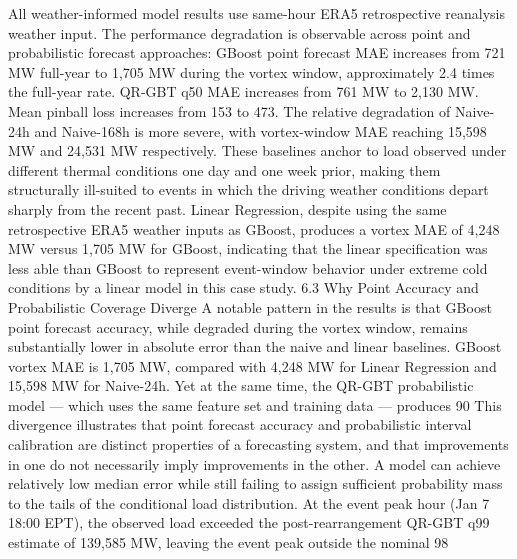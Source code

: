 All weather-informed model results use same-hour ERA5 retrospective reanalysis weather input. The performance degradation is observable across point and probabilistic forecast approaches: GBoost point forecast MAE increases from 721 MW full-year to 1,705 MW during the vortex window, approximately 2.4 times the full-year rate. QR-GBT q50 MAE increases from 761 MW to 2,130 MW. Mean pinball loss increases from 153 to 473.
The relative degradation of Naive-24h and Naive-168h is more severe, with vortex-window MAE reaching 15,598 MW and 24,531 MW respectively. These baselines anchor to load observed under different thermal conditions one day and one week prior, making them structurally ill-suited to events in which the driving weather conditions depart sharply from the recent past. Linear Regression, despite using the same retrospective ERA5 weather inputs as GBoost, produces a vortex MAE of 4,248 MW versus 1,705 MW for GBoost, indicating that the linear specification was less able than GBoost to represent event-window behavior under extreme cold conditions by a linear model in this case study.
6.3 Why Point Accuracy and Probabilistic Coverage Diverge
A notable pattern in the results is that GBoost point forecast accuracy, while degraded during the vortex window, remains substantially lower in absolute error than the naive and linear baselines. GBoost vortex MAE is 1,705 MW, compared with 4,248 MW for Linear Regression and 15,598 MW for Naive-24h. Yet at the same time, the QR-GBT probabilistic model — which uses the same feature set and training data — produces 90%
This divergence illustrates that point forecast accuracy and probabilistic interval calibration are distinct properties of a forecasting system, and that improvements in one do not necessarily imply improvements in the other. A model can achieve relatively low median error while still failing to assign sufficient probability mass to the tails of the conditional load distribution.
At the event peak hour (Jan 7 18:00 EPT), the observed load exceeded the post-rearrangement QR-GBT q99 estimate of 139,585 MW, leaving the event peak outside the nominal 98%
